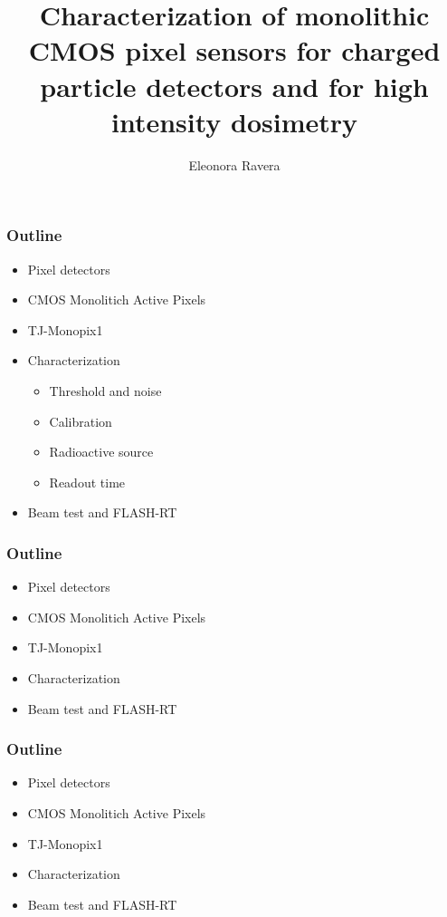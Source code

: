 \documentclass{beamer}
\title[]{Characterization of monolithic CMOS pixel sensors for charged particle detectors and for high intensity dosimetry}
\institute{Università degli studi di Pisa}
\author[E. Ravera]{Eleonora Ravera}
\begin{document}
	 
\begin{frame}
\setTitlestyleDissertation
\maketitle
\end{frame}

\usetikzlibrary{decorations.pathreplacing}        


\begin{frame}
    \frametitle{Outline}
    \begin{itemize}
        \item Pixel detectors 
        \item CMOS Monolitich Active Pixels 
        \item TJ-Monopix1
        \item Characterization 
        \begin{itemize}
            \item Threshold and noise
            \item Calibration 
            \item Radioactive source
            \item Readout time
        \end{itemize}
        \item Beam test and FLASH-RT
    \end{itemize}
\end{frame}

\begin{frame}
    \frametitle{Outline}
    \begin{itemize}
        \item Pixel detectors 
        \item CMOS Monolitich Active Pixels 
        \item TJ-Monopix1
        \item Characterization 
        \item Beam test and FLASH-RT
    \end{itemize}
\end{frame}



\begin{frame}
    \frametitle{Outline}
    \begin{itemize}
        \item Pixel detectors 
        \item CMOS Monolitich Active Pixels 
        \item TJ-Monopix1
        \item Characterization 
        \item Beam test and FLASH-RT
    \end{itemize}
\end{frame}

\end{document}
